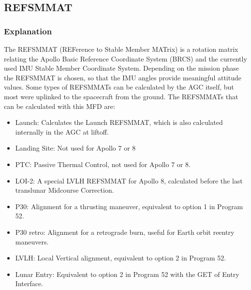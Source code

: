 \documentclass[11pt]{article} %
\begin{document}
\newpage
\subsection{REFSMMAT}

\subsubsection{Explanation}

The REFSMMAT (REFerence to Stable Member MATrix) is a rotation matrix relating the Apollo Basic Reference Coordinate System (BRCS) and the currently used IMU Stable Member Coordinate System. Depending on the mission phase the REFSMMAT is chosen, so that the IMU angles provide meaningful attitude values. Some types of REFSMMATs can be calculated by the AGC itself, but most were uplinked to the spacecraft from the ground. The REFSMMATs that can be calculated with this MFD are:

\begin{itemize}
	\item{Launch: Calculates the Launch REFSMMAT, which is also calculated internally in the AGC at liftoff.}
	\item{Landing Site: Not used for Apollo 7 or 8}
	\item{PTC: Passive Thermal Control, not used for Apollo 7 or 8.}
	\item{LOI-2: A special LVLH REFSMMAT for Apollo 8, calculated before the last translunar Midcourse Correction.}
	\item{P30: Alignment for a thrusting maneuver, equivalent to option 1 in Program 52.}
	\item{P30 retro: Alignment for a retrograde burn, useful for Earth orbit reentry maneuvers.}
	\item{LVLH: Local Vertical alignment, equivalent to option 2 in Program 52.}
	\item{Lunar Entry: Equivalent to option 2 in Program 52 with the GET of Entry Interface.}
\end{itemize}
	
\end{document}
